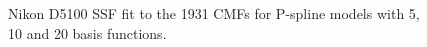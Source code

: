 \begin{figure}
    \centering
    \caption{Nikon D5100 SSF fit to the 1931 CMFs for P-spline models with 5, 10 and 20 basis functions.}
    \label{fig:nikonfit}
\end{figure}


